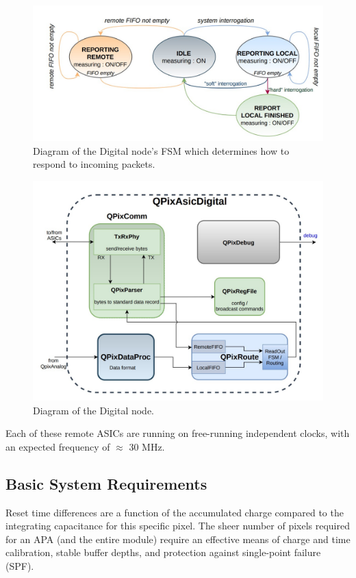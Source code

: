 \begin{figure}[ht!]
\centering
\includegraphics[width=\textwidth]{images/digital_fsm_overview.jpg}
\caption{Diagram of the Digital node's FSM which determines how to respond to incoming packets.}
\end{figure}


\begin{figure}[ht!]
\centering
\includegraphics[width=\textwidth]{images/digital_node_overview.jpg}
\caption{Diagram of the Digital node.}
\end{figure}

Each of these remote ASICs are running on free-running independent clocks, with an expected frequency of $\approx$ 30 MHz.

\subsection{Basic System Requirements}

Reset time differences are a function of the accumulated charge compared to the integrating capacitance for this specific pixel.
The sheer number of pixels required for an APA (and the entire module) require an effective means of charge and time calibration, stable buffer depths, and protection against single-point failure (SPF). 

